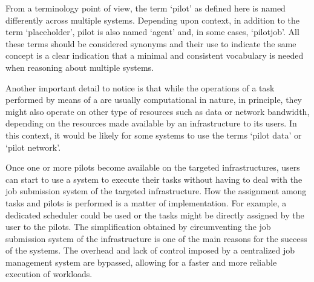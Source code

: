 \documentclass{sig-alternate}
\begin{document}
From a terminology point of view, the term `pilot' as defined here is
named differently across multiple \pilotjob systems. Depending upon
context, in addition to the term `placeholder', pilot is also named
`agent' and, in some cases, `pilotjob'.  All these terms should be considered synonyms and their use
to indicate the same concept is a clear indication that a minimal and
consistent vocabulary is needed when reasoning about multiple
\pilotjob systems.



Another important detail to notice is that while the operations of a
task performed by means of a \pilot are usually computational in
nature, in principle, they might also operate on other type of
resources such as data or network bandwidth, depending on the
resources made available by an infrastructure to its users. In this
context, it would be likely for some \pilotjob systems to use the
terms `pilot data' or `pilot network'.

 



Once one or more pilots become available on the targeted
infrastructures, users can start to use a \pilotjob system to execute
their tasks without having to deal with the job submission system of
the targeted infrastructure.  How the assignment  among tasks and pilots
is performed is a matter of implementation. For example, a dedicated
scheduler could be used or the tasks might be directly assigned by the
user to the pilots. The simplification obtained by circumventing the
job submission system of the infrastructure is one of the main reasons
for the success of the \pilotjob systems. The overhead and lack of
control imposed by a centralized job management system are bypassed,
allowing for a faster and more reliable execution of workloads.
\end{document}
